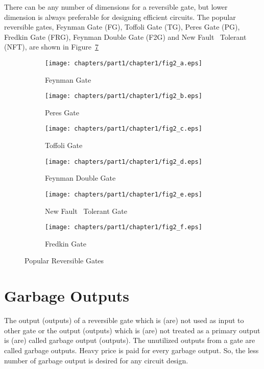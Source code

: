 \begin{example}\textnormal{
There can be any number of dimensions for a reversible gate, but lower~ dimension is always preferable for designing efficient circuits. The popular reversible gates, Feynman Gate (FG), Toffoli Gate (TG), Peres Gate (PG), Fredkin Gate (FRG), Feynman Double Gate (F2G) and New Fault~ Tolerant (NFT), are shown in Figure~\ref{fig:p1_c1_fig2}}
\end{example}
\begin{figure}[H]
\centering
\begin{subfigure}[b]{0.30\textwidth}
\centering
\texttt{[image: chapters/part1/chapter1/fig2\_a.eps]}
\caption{Feynman Gate}
\label{fig:p1_c1_fig2_a}
\end{subfigure}
\begin{subfigure}[b]{0.30\textwidth}
\centering
\texttt{[image: chapters/part1/chapter1/fig2\_b.eps]}
\caption{Peres Gate}
\label{fig:p2_c1_fig2_b}
\end{subfigure}
\begin{subfigure}[b]{0.30\textwidth}
\centering
\texttt{[image: chapters/part1/chapter1/fig2\_c.eps]}
\caption{Toffoli Gate}
\label{fig:p1_c1_fig2_c}
\end{subfigure}

\begin{subfigure}[b]{0.30\textwidth}
\centering
\texttt{[image: chapters/part1/chapter1/fig2\_d.eps]}
\caption{Feynman Double Gate}
\label{fig:p1_c1_fig2_d}
\end{subfigure}
\begin{subfigure}[b]{0.30\textwidth}
\centering
\texttt{[image: chapters/part1/chapter1/fig2\_e.eps]}
\caption{New Fault~ Tolerant Gate}
\label{fig:p1_c1_fig2_e}
\end{subfigure}
\begin{subfigure}[b]{0.30\textwidth}
\centering
\texttt{[image: chapters/part1/chapter1/fig2\_f.eps]}
\caption{Fredkin Gate}
\label{fig:p1_c1_fig2_f}
\end{subfigure}
\caption{Popular Reversible Gates}
\label{fig:p1_c1_fig2}
\end{figure}

\section{Garbage Outputs}

The output (outputs) of a reversible gate which is (are) not used as input to other gate or the output (outputs) which is (are) not treated as a primary output is (are) called garbage output (outputs). The unutilized outputs
from a gate are called garbage outputs. Heavy price is paid for every garbage output. So, the less number of garbage output is desired for any circuit design.


